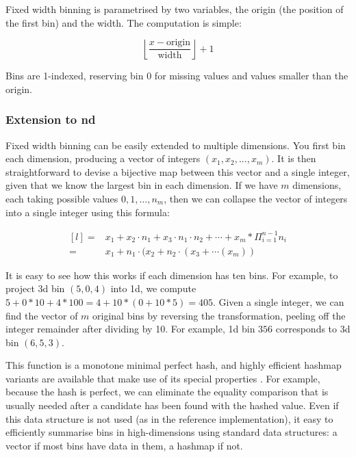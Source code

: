 \documentclass[journal]{vgtc}                %
\begin{document}
Fixed width binning is parametrised by two variables, the origin (the position of the first bin) and the width. The computation is simple:

\begin{equation}
  \label{eq:fixed-width}
  \left \lfloor \frac{x - \text{origin}}{\text{width}} \right \rfloor + 1
\end{equation}

Bins are 1-indexed, reserving bin 0 for missing values and values smaller than the origin.

\subsubsection{Extension to nd}

Fixed width binning can be easily extended to multiple dimensions. You first bin each dimension, producing a vector of integers $(x_1, x_2, ..., x_m)$. It is then straightforward to devise a bijective map between this vector and a single integer, given that we know the largest bin in each dimension. If we have $m$ dimensions, each taking possible values $0, 1, \ldots, n_m$, then we can collapse the vector of integers into a single integer using this formula:

\begin{equation}
  \label{eq:nd-bins}
  \begin{matrix*}[l]
   = & x_1 + x_2 \cdot n_1 + x_3 \cdot n_1 \cdot n_2 + \cdots + x_m * \Pi^{n-1}_{i = 1} n_i \\
   = & x_1 + n_1 \cdot (x_2 + n_2 \cdot (x_3 + \cdots(x_m))
  \end{matrix*}
\end{equation}

It is easy to see how this works if each dimension has ten bins. For example, to project 3d bin $(5, 0, 4)$ into 1d, we compute $5 + 0 * 10 + 4 * 100 = 4 + 10 * (0 + 10 * 5) = 405$. Given a single integer, we can find the vector of $m$ original bins by reversing the transformation, peeling off the integer remainder after dividing by 10. For example, 1d bin $356$ corresponds to 3d bin $(6, 5, 3)$.

This function is a monotone minimal perfect hash, and highly efficient hashmap variants are available that make use of its special properties \citep{belazzougui:2009}. For example, because the hash is perfect, we can eliminate the equality comparison that is usually needed after a candidate has been found with the hashed value. Even if this data structure is not used (as in the reference implementation), it easy to efficiently summarise bins in high-dimensions using standard data structures: a vector if most bins have data in them, a hashmap if not.
\end{document}
